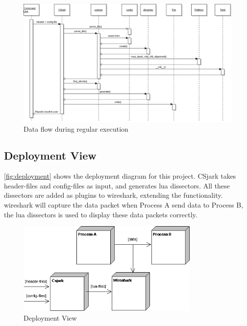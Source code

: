 \begin{figure}[htb]
	\center
	\includegraphics[width=\textwidth]{./evaluation/img/FinalSequenceDiagram}
	\caption{Data flow during regular execution\label{fig:processview}}
\end{figure}


\subsection{Deployment View}

\autoref{fig:deployment} shows the deployment diagram for this project. CSjark 
takes \gls{header}-files and config-files as input, and generates \Gls{lua} 
\glspl{dissector}. All these \glspl{dissector} are added as plugins to 
\Gls{wireshark}, extending the functionality. \Gls{wireshark} will capture the 
data packet when Process A send data to Process B, the \Gls{lua} 
\glspl{dissector} is used to display these data packets correctly.

\begin{figure}[htb]
	\center
	\includegraphics[width = 0.8\textwidth]{./planning/img/Deployment}
	\caption{Deployment View\label{fig:deployment}}
\end{figure}

